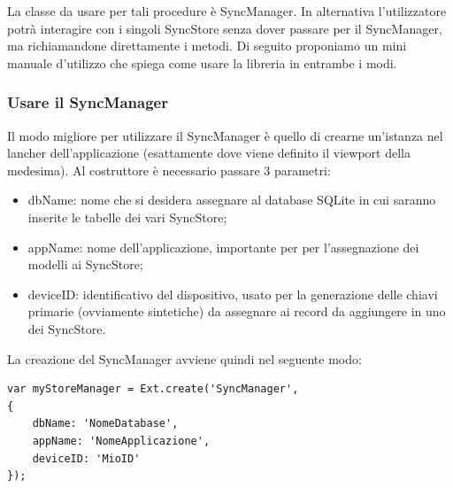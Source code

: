 \documentclass[10pt,a4paper,onecolumn]{article}
\begin{document}
La classe da usare per tali procedure è SyncManager. In alternativa l'utilizzatore potrà interagire con i singoli SyncStore senza dover passare per il SyncManager, ma richiamandone direttamente i metodi. Di seguito proponiamo un mini manuale d'utilizzo che spiega come usare la libreria in entrambe i modi.

\subsubsection{Usare il SyncManager}

Il modo migliore per utilizzare il SyncManager è quello di crearne un'istanza nel lancher dell'applicazione (esattamente dove viene definito il viewport della medesima). Al costruttore è necessario passare 3 parametri: 
\begin{itemize}
	\item dbName: nome che si desidera assegnare al database SQLite in cui saranno inserite le tabelle dei vari SyncStore;
	\item appName: nome dell'applicazione, importante per per l'assegnazione dei modelli ai SyncStore;
	\item deviceID: identificativo del dispositivo, usato per la generazione delle chiavi primarie (ovviamente sintetiche) da assegnare ai record da aggiungere in uno dei SyncStore.
\end{itemize}

La creazione del SyncManager avviene quindi nel seguente modo:

\begin{lstlisting}
var myStoreManager = Ext.create('SyncManager',
{
	dbName: 'NomeDatabase',
	appName: 'NomeApplicazione',
	deviceID: 'MioID'
});
\end{lstlisting}
\end{document}
